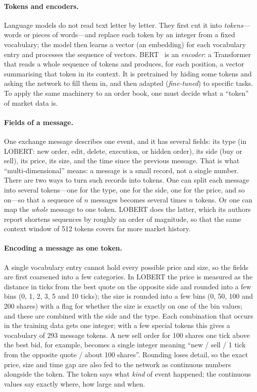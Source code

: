 \paragraph{Tokens and encoders.} Language models do not read text letter by letter. They first cut it
into \emph{tokens}---words or pieces of words---and replace each token by an integer from a fixed
vocabulary; the model then learns a vector (an embedding) for each vocabulary entry and processes the
sequence of vectors. BERT~\citep{devlin2019} is an \emph{encoder}: a Transformer that reads a whole
sequence of tokens and produces, for each position, a vector summarising that token in its context. It is
pretrained by hiding some tokens and asking the network to fill them in, and then adapted
(\emph{fine-tuned}) to specific tasks. To apply the same machinery to an order book, one must decide what
a ``token'' of market data is.

\paragraph{Fields of a message.} One exchange message describes one event, and it has several fields: its
type (in LOBERT: new order, edit, delete, execution, or hidden order), its side (buy or sell), its price, its size, and
the time since the previous message. That is what ``multi-dimensional'' means: a message is a small record,
not a single number. There are two ways to turn such records into tokens. One can split each message into
several tokens---one for the type, one for the side, one for the price, and so on---so that a sequence of
$n$ messages becomes several times $n$ tokens. Or one can map the \emph{whole} message to one token. LOBERT
does the latter, which its authors report shortens sequences by roughly an order of magnitude, so that the
same context window of 512 tokens covers far more market history.

\paragraph{Encoding a message as one token.} A single vocabulary entry cannot hold every possible price
and size, so the fields are first coarsened into a few categories. In LOBERT the price is measured as the
distance in ticks from the best quote on the opposite side and rounded into a few bins (0, 1, 2, 3, 5 and
10 ticks); the size is rounded into a few bins (0, 50, 100 and 200 shares) with a flag for whether the size is exactly on one of the bin values; and
these are combined with the side and the type. Each combination that occurs in the training data gets
one integer; with a few special tokens this gives a vocabulary of 293 message tokens. A new sell order for 100 shares one tick above the best bid, for example, becomes a
single integer meaning ``new / sell / 1 tick from the opposite quote / about 100 shares''. Rounding loses
detail, so the exact price, size and time gap are also fed to the network as continuous numbers alongside
the token. The token says what \emph{kind} of event happened; the continuous values say exactly where,
how large and when.

